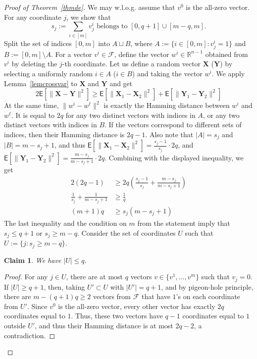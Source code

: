\documentclass[graybox]{svmult}
\renewcommand{\le}{\leqslant}
\renewcommand{\ge}{\geqslant}
\renewcommand{\E}{\mathsf{E}}
\newtheorem{cla}[thm]{Claim}
\begin{document}
\begin{proof}[Proof of Theorem~\ref{thmde}] We may w.l.o.g. assume that $v^0$ is the all-zero vector. For any coordinate $j$, we show that  \begin{equation}\label{eqvalq} s_j:=\sum_{i\in [m]}v^i_j \text{ \ \ belongs to }[0,q+1]\cup [m-q,m].\end{equation}
 Split the set of indices $[0,m]$ into $A\sqcup B$, where $A:=\{i\in[0,m]: v_j^i=1\}$ and $B:=[0,m]\setminus A$. For a vector $v^i\in \mathcal F$, define the vector $w^i\in \mathbb R^{n-1}$ obtained from $v^i$ by deleting the $j$-th coordinate. Let us define a random vector $\mathbf X$ ($\mathbf Y$) by selecting a uniformly random $i\in A$ ($i\in B$) and taking the  vector $w^i$. We apply Lemma~\ref{lemcrossvar} to $\mathbf X$ and $\mathbf Y$ and get
  $$2\E[\|\mathbf X-\mathbf Y\|^2]\ge \E[\|\mathbf X_1-\mathbf X_2\|^2]+\E[\|\mathbf Y_1-\mathbf Y_2\|^2]$$
  At the same time, $\|w^i-w^\ell\|^2$ is exactly the Hamming distance between $w^i$ and $w^\ell$. It is equal to $2q$ for any two distinct vectors with indices in $A$, or any two distinct vectors with indices in $B$. If the vectors correspond to different sets of indices, then their Hamming distance is $2q-1$. Also note that $|A| = s_j$ and $|B| = m-s_j+1$, and thus $\E[\|\mathbf X_1-\mathbf X_2\|^2] = \frac{s_j-1}{s_j} \cdot 2q$, and $\E[\|\mathbf Y_1-\mathbf Y_2\|^2] = \frac{m-s_j}{m-s_j+1} \cdot 2q$. Combining with the displayed inequality, we get
  \begin{align*} 2(2q-1)&\ge 2q\left(\frac{s_j-1}{s_j}+\frac{m-s_j}{m-s_j+1}\right)\\
  \frac 1{s_j}+\frac1{m-s_j+1} &\ge \frac 1q\\
  (m+1)q&\ge s_j(m-s_j+1)\end{align*}
The last inequality and the condition on $m$ from the statement imply that $s_j\le q+1$ or $s_j\ge m-q$. Consider the set of coordinates $U$ such that $U:=\{j: s_j\ge m-q\}$.
\begin{cla}We have $|U|\le q$.\end{cla}
\begin{proof}   For any $j\in U$, there are at most $q$ vectors  $v\in \{v^1,\ldots, v^m\}$ such that $v_j=0$. If $|U|\ge q+1$, then, taking  $U'\subset U$ with $|U'|=q+1$, and by pigeon-hole principle, there are $m-(q+1)q\ge 2$ vectors from $\mathcal F$ that have $1$'s on each coordinate from $U'$. Since $v^0$ is the all-zero vector, every other vector has exactly $2q$ coordinates equal to $1$. Thus, these two vectors have $q-1$ coordinates equal to $1$ outside $U'$, and thus their Hamming distance is at most $2q-2$, a contradiction.\end{proof}


\end{proof}
\end{document}
